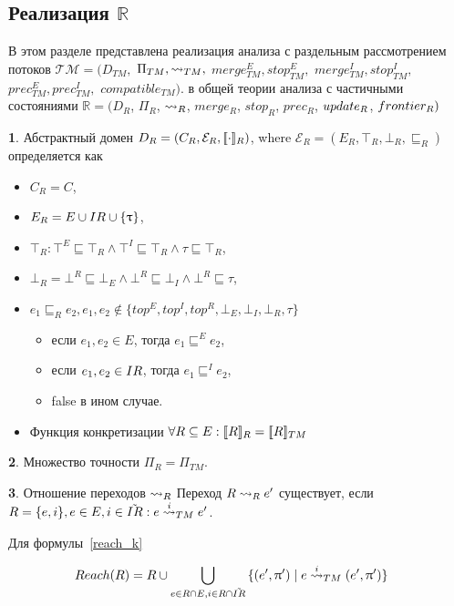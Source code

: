 \subsection{Реализация $\mathbb{R}$}

В этом разделе представлена реализация анализа с раздельным рассмотрением потоков 
$\mathcal{TM}=(D_{TM},$ $\Pi_{TM}, \leadsto_{TM},$ $merge^E_{TM}, stop^E_{TM},$ $merge^I_{TM}, stop^I_{TM},$ $prec^E_{TM},prec^I_{TM},$ $compatible_{TM})$.
в общей теории анализа с частичными состояниями
$\mathbb{R}=(D_R$, $\Pi_R$, $\leadsto_R$, $merge_R$, $stop_R$, $prec_R$, $update_R$, $frontier_R)$


{\textbf 1.} Абстрактный домен $D_R = (C_R,\mathcal{E}_R,[\![ \cdot ]\!]_R)$, where $\mathcal{E}_R=(E_R,\top_R, \bot_R, \sqsubseteq_R)$ определяется как
\begin{itemize}
\item $C_R = C$,
\item $E_R = E \cup IR \cup \{\uptau\}$,
\item $\top_R: \top^E \sqsubseteq \top_R \land \top^I \sqsubseteq \top_R \land \tau \sqsubseteq \top_R$,
\item $\bot_R = \bot^R \sqsubseteq \bot_E \land \bot^R \sqsubseteq \bot_I \land \bot^R \sqsubseteq \tau$,
\item $e_1 \sqsubseteq_R e_2, e_1, e_2 \notin \{top^E, top^I, top^R, \bot_E, \bot_I, \bot_R, \tau\}$
\begin{itemize}
\item если $e_1,e_2 \in E$, тогда $e_1 \sqsubseteq^E e_2$,
\item если $e_1,e_2 \in IR$, тогда $e_1 \sqsubseteq^I e_2$,
\item false в ином случае.
\end{itemize}
\item Функция конкретизации 
$\forall R\subseteq E: [\![ R ]\!]_R = [\![ R ]\!]_{TM}$
\end{itemize}

{\textbf 2.} Множество точности $\Pi_R = \Pi_{TM}$.

{\textbf 3.} Отношение переходов $\leadsto_{R}$
Переход $R \leadsto_{R} e'$ существует, если $R = \{e, i\}, e \in E, i \in \tilde{IR}: e \stackrel{i}{\leadsto}_{TM} e'$.

Для формулы~\ref{reach_k} 

\begin{equation}
\label{cpa_tm_transfer}
\begin{aligned}
& Reach(R) = R \cup \bigcup_{e \in R \cap E, i \in R \cap \tilde{IR}}{\{(e', \uppi') \mid e \stackrel{i}{\leadsto}_{TM} (e', \uppi')\}}
\end{aligned}
\end{equation}

